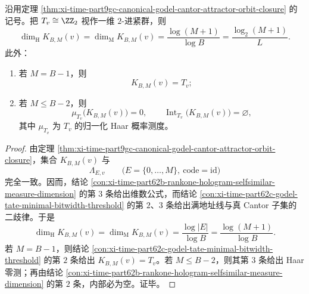 \begin{theorem}\label{thm:xi-time-part9gc-canonical-godel-attractor-dimension-haar-dichotomy}
沿用定理 \ref{thm:xi-time-part9gc-canonical-godel-cantor-attractor-orbit-closure} 的记号。把 \(T_v\cong \ZZ_2\) 视作一维 \(2\)-进紧群，则
\[
\dim_{\mathrm H}K_{B,M}(v)
=
\dim_{\mathrm M}K_{B,M}(v)
=
\frac{\log(M+1)}{\log B}
=
\frac{\log_2(M+1)}{L}.
\]
此外：
\begin{enumerate}
  \item 若 \(M=B-1\)，则
  \[
  K_{B,M}(v)=T_v;
  \]
  \item 若 \(M\le B-2\)，则
  \[
  \mu_{T_v}\bigl(K_{B,M}(v)\bigr)=0,
  \qquad
  \operatorname{Int}_{T_v}\bigl(K_{B,M}(v)\bigr)=\varnothing,
  \]
  其中 \(\mu_{T_v}\) 为 \(T_v\) 的归一化 Haar 概率测度。
\end{enumerate}
\end{theorem}
\begin{proof}
由定理 \ref{thm:xi-time-part9gc-canonical-godel-cantor-attractor-orbit-closure}，集合 \(K_{B,M}(v)\) 与
\[
\Lambda_{E,v}
\qquad
\bigl(E=\{0,\dots,M\},\ \mathrm{code}=\mathrm{id}\bigr)
\]
完全一致。因而，结论 \ref{con:xi-time-part62b-rankone-hologram-selfsimilar-measure-dimension} 的第 \(3\) 条给出维数公式，而结论 \ref{con:xi-time-part62c-godel-tate-minimal-bitwidth-threshold} 的第 \(2\)、\(3\) 条给出满地址线与真 Cantor 子集的二歧律。于是
\[
\dim_{\mathrm H}K_{B,M}(v)
=
\dim_{\mathrm M}K_{B,M}(v)
=
\frac{\log|E|}{\log B}
=
\frac{\log(M+1)}{\log B}.
\]
若 \(M=B-1\)，则结论 \ref{con:xi-time-part62c-godel-tate-minimal-bitwidth-threshold} 的第 \(2\) 条给出 \(K_{B,M}(v)=T_v\)。若 \(M\le B-2\)，则其第 \(3\) 条给出 Haar 零测；再由结论 \ref{con:xi-time-part62b-rankone-hologram-selfsimilar-measure-dimension} 的第 \(2\) 条，内部必为空。证毕。
\end{proof}

